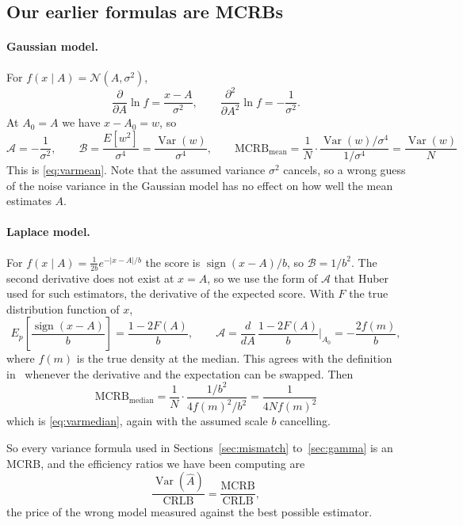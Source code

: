 \documentclass[11pt]{article}
\numberwithin{figure}{section}
\numberwithin{equation}{section}
\begin{document}
\subsection{Our earlier formulas are MCRBs}

\paragraph{Gaussian model.} For $f(x\mid A) = \mathcal{N}(A, \sigma^2)$,
\[
  \frac{\partial}{\partial A}\ln f = \frac{x - A}{\sigma^2}, \qquad
  \frac{\partial^2}{\partial A^2}\ln f = -\frac{1}{\sigma^2}.
\]
At $A_0 = A$ we have $x - A_0 = w$, so
\[
  \mathcal{A} = -\frac{1}{\sigma^2}, \qquad \mathcal{B} = \frac{E[w^2]}{\sigma^4} = \frac{\operatorname{Var}(w)}{\sigma^4},
  \qquad
  \boxed{\text{MCRB}_{\text{mean}} = \frac{1}{N}\cdot\frac{\operatorname{Var}(w)/\sigma^4}{1/\sigma^4} = \frac{\operatorname{Var}(w)}{N}}
\]
This is \eqref{eq:varmean}. Note that the assumed variance $\sigma^2$ cancels, so a wrong guess of the
noise variance in the Gaussian model has no effect on how well the mean estimates $A$.

\paragraph{Laplace model.} For $f(x\mid A) = \frac{1}{2b}e^{-|x-A|/b}$ the score is
$\operatorname{sign}(x - A)/b$, so $\mathcal{B} = 1/b^2$. The second derivative does not exist at
$x = A$, so we use the form of $\mathcal{A}$ that Huber~\cite{huber67} used for such estimators, the
derivative of the expected score. With $F$ the true distribution function of $x$,
\[
  E_p\!\left[\frac{\operatorname{sign}(x - A)}{b}\right] = \frac{1 - 2F(A)}{b},
  \qquad
  \mathcal{A} = \frac{d}{dA}\,\frac{1 - 2F(A)}{b}\bigg|_{A_0} = -\frac{2 f(m)}{b},
\]
where $f(m)$ is the true density at the median. This agrees with the definition in~\cite{fortunati}
whenever the derivative and the expectation can be swapped. Then
\[
  \boxed{\text{MCRB}_{\text{median}} = \frac{1}{N}\cdot\frac{1/b^2}{4f(m)^2/b^2} = \frac{1}{4N f(m)^2}}
\]
which is \eqref{eq:varmedian}, again with the assumed scale $b$ cancelling.

So every variance formula used in Sections~\ref{sec:mismatch} to~\ref{sec:gamma} is an MCRB, and the
efficiency ratios we have been computing are
\[
  \frac{\operatorname{Var}(\hat A)}{\text{CRLB}} = \frac{\text{MCRB}}{\text{CRLB}} ,
\]
the price of the wrong model measured against the best possible estimator.
\end{document}
